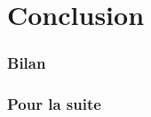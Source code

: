 \section{Conclusion}

\begin{frame}
	\frametitle{Bilan}
\end{frame}

\begin{frame}
	\frametitle{Pour la suite}
\end{frame}

%
%
%
%

